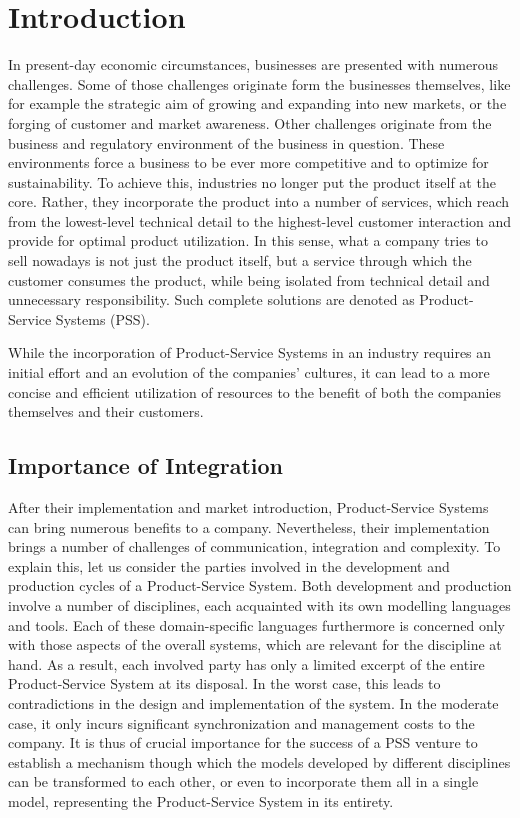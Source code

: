 \chapter{Introduction}
\label{chap:intro}

In present-day economic circumstances, businesses are presented with numerous challenges. Some of those challenges originate form the businesses themselves, like for example the strategic aim of growing and expanding into new markets, or the forging of customer and market awareness. Other challenges originate from the business and regulatory environment of the business in question. These environments force a business to be ever more competitive and to optimize for sustainability. To achieve this, industries no longer put the product itself at the core. Rather, they incorporate the product into a number of services, which reach from the lowest-level technical detail to the highest-level customer interaction and provide for optimal product utilization. In this sense, what a company tries to sell nowadays is not just the product itself, but a service through which the customer consumes the product, while being isolated from technical detail and unnecessary responsibility. Such complete solutions are denoted as Product-Service Systems (PSS).

While the incorporation of Product-Service Systems in an industry requires an initial effort and an evolution of the companies' cultures, it can lead to a more concise and efficient utilization of resources to the benefit of both the companies themselves and their customers. 

\section*{Importance of Integration}

After their implementation and market introduction, Product-Service Systems can bring numerous benefits to a company. Nevertheless, their implementation brings a number of challenges of communication, integration and complexity. To explain this, let us consider the parties involved in the development and production cycles of a Product-Service System. Both development and production involve a number of disciplines, each acquainted with its own modelling languages and tools. Each of these domain-specific languages furthermore is concerned only with those aspects of the overall systems, which are relevant for the discipline at hand. As a result, each involved party has only a limited excerpt of the entire Product-Service System at its disposal. In the worst case, this leads to contradictions in the design and implementation of the system. In the moderate case, it only incurs significant synchronization and management costs to the company. It is thus of crucial importance for the success of a PSS venture to establish a mechanism though which the models developed by different disciplines can be transformed to each other, or even to incorporate them all in a single model, representing the Product-Service System in its entirety.

